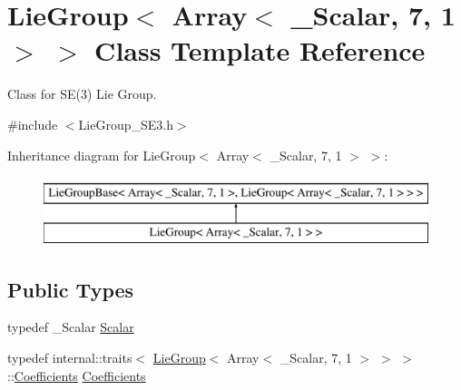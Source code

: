 \hypertarget{class_lie_group_3_01_array_3_01___scalar_00_017_00_011_01_4_01_4}{}\section{Lie\+Group$<$ Array$<$ \+\_\+\+Scalar, 7, 1 $>$ $>$ Class Template Reference}
\label{class_lie_group_3_01_array_3_01___scalar_00_017_00_011_01_4_01_4}


Class for S\+E(3) Lie Group.  




{\ttfamily \#include $<$Lie\+Group\+\_\+\+S\+E3.\+h$>$}

Inheritance diagram for Lie\+Group$<$ Array$<$ \+\_\+\+Scalar, 7, 1 $>$ $>$\+:\begin{figure}[H]
\begin{center}
\leavevmode
\includegraphics[height=2.000000cm]{class_lie_group_3_01_array_3_01___scalar_00_017_00_011_01_4_01_4}
\end{center}
\end{figure}
\subsection*{Public Types}
\begin{DoxyCompactItemize}
\item 
typedef \+\_\+\+Scalar \hyperlink{class_lie_group_3_01_array_3_01___scalar_00_017_00_011_01_4_01_4_a5fd29a7be3621d5df2717d910d47b3ce}{Scalar}
\item 
typedef internal\+::traits$<$ \hyperlink{class_lie_group}{Lie\+Group}$<$ Array$<$ \+\_\+\+Scalar, 7, 1 $>$ $>$ $>$\+::\hyperlink{class_lie_group_3_01_array_3_01___scalar_00_017_00_011_01_4_01_4_aa5d0fac468a8bdbb468bf2218b93ee0e}{Coefficients} \hyperlink{class_lie_group_3_01_array_3_01___scalar_00_017_00_011_01_4_01_4_aa5d0fac468a8bdbb468bf2218b93ee0e}{Coefficients}
\end{DoxyCompactItemize}
